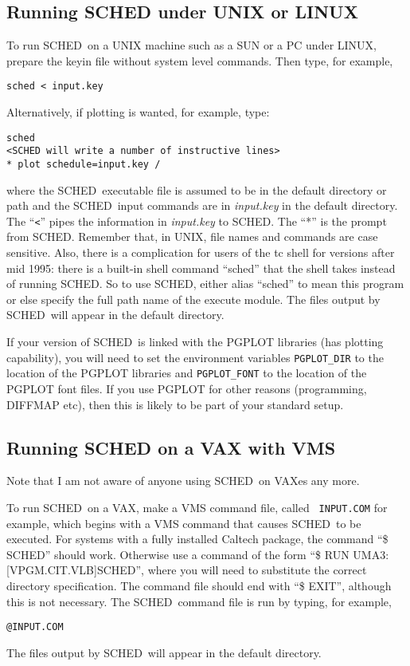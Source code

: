 \documentclass{report}
\newcommand{\sched}{{\sc SCHED}}
\newcommand{\schedb}{{\sc SCHED~}}
\begin{document}
\subsection{\label{SSEC:RUNUNIX}Running SCHED under UNIX or LINUX}

To run \schedb on a UNIX machine such as a SUN or a PC under LINUX,
prepare the keyin file without system level commands.  Then type, for
example,
\begin{verbatim}
sched < input.key
\end{verbatim}
Alternatively, if plotting is wanted, for example, type:
\begin{verbatim}
sched
<SCHED will write a number of instructive lines>
* plot schedule=input.key /
\end{verbatim}
where the \schedb executable file is assumed to be in the default
directory or path and the \schedb input commands are in {\sl input.key}
in the default directory. The ``{\tt <}'' pipes the information in
{\sl input.key} to \sched.  The ``*'' is the prompt from \sched.
Remember that, in UNIX, file names and
commands are case sensitive.  Also, there is a complication for users
of the tc shell for versions after mid 1995: there is a built-in shell
command ``sched'' that the shell takes instead of running {\sc
SCHED}. So to use \sched, either alias ``sched'' to mean this
program or else specify the full path name of the execute module. The
files output by \schedb will appear in the default directory.

If your version of \schedb is linked with the {\sc PGPLOT} libraries
(has plotting capability), you will need
to set the environment variables {\tt PGPLOT\_DIR} to the location of
the {\sc PGPLOT} libraries and {\tt PGPLOT\_FONT} to the location of
the {\sc PGPLOT} font files.  If you use {\sc PGPLOT} for other
reasons (programming, DIFFMAP etc), then this is likely to be part
of your standard setup.

\subsection{\label{SSEC:RUNVAX}Running SCHED on a VAX with VMS}

Note that I am not aware of anyone using \schedb on VAXes any more.

To run \schedb on a VAX, make a VMS command file, called {\tt
INPUT.COM} for example, which begins with a VMS command that causes
\schedb to be executed. For systems with a fully installed Caltech
package, the command ``\$ \sched'' should work. Otherwise use a
command of the form ``\$ RUN UMA3:[VPGM.CIT.VLB]\sched'', where
you will need to substitute the correct directory specification. The
command file should end with ``\$ EXIT'', although this is not
necessary. The \schedb command file is run by typing, for example,
\begin{verbatim}
@INPUT.COM
\end{verbatim}
The files output by \schedb will appear in the default directory.
\end{document}
